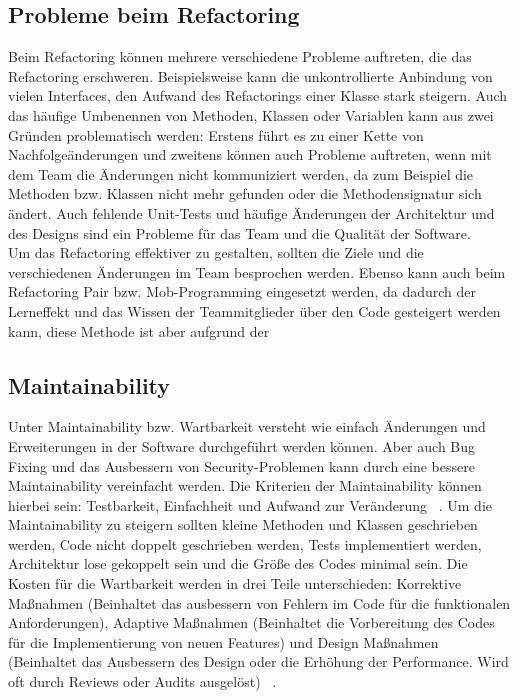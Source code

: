 \subsection{Probleme beim Refactoring}
Beim Refactoring können mehrere verschiedene Probleme auftreten, die das Refactoring erschweren. Beispielsweise kann die unkontrollierte Anbindung von vielen Interfaces, den Aufwand des Refactorings einer Klasse stark steigern. Auch das häufige Umbenennen von Methoden, Klassen oder Variablen kann aus zwei Gründen problematisch werden: Erstens führt es zu einer Kette von Nachfolgeänderungen und zweitens können auch Probleme auftreten, wenn mit dem Team die Änderungen nicht kommuniziert werden, da zum Beispiel die Methoden bzw. Klassen nicht mehr gefunden oder die Methodensignatur sich ändert. Auch fehlende Unit-Tests und häufige Änderungen der Architektur und des Designs sind ein Probleme für das Team und die Qualität der Software. ~\parencite{khanambarriers} \\
Um das Refactoring effektiver zu gestalten, sollten die Ziele und die verschiedenen Änderungen im Team besprochen werden. Ebenso kann auch beim Refactoring Pair bzw. Mob-Programming eingesetzt werden, da dadurch der Lerneffekt und das Wissen der Teammitglieder über den Code gesteigert werden kann, diese Methode ist aber aufgrund der 
\subsection{Maintainability}
Unter Maintainability bzw. Wartbarkeit versteht wie einfach Änderungen und Erweiterungen in der Software durchgeführt werden können. Aber auch Bug Fixing und das Ausbessern von Security-Problemen kann durch eine bessere Maintainability vereinfacht werden. Die Kriterien der Maintainability können hierbei sein: Testbarkeit, Einfachheit und Aufwand zur Veränderung ~\parencite{kukrejaMaintainability}. Um die Maintainability zu steigern sollten kleine Methoden und Klassen geschrieben werden, Code nicht doppelt geschrieben werden, Tests implementiert werden, Architektur lose gekoppelt sein und die Größe des Codes minimal sein. Die Kosten für die Wartbarkeit werden in drei Teile unterschieden: Korrektive Maßnahmen (Beinhaltet das ausbessern von Fehlern im Code für die funktionalen Anforderungen), Adaptive Maßnahmen (Beinhaltet die Vorbereitung des Codes für die Implementierung von neuen Features) und Design Maßnahmen (Beinhaltet das Ausbessern des Design oder die Erhöhung der Performance. Wird oft durch Reviews oder Audits ausgelöst) ~\parencite{cheaitoMaintainability}.
